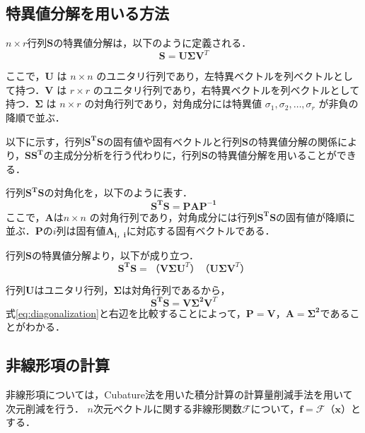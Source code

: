 \documentclass[a4j,12pt]{jreport}
\begin{document}
\subsection{特異値分解を用いる方法}
$n \times r$行列$\mathbf{S}$の特異値分解は，以下のように定義される．
\[
\mathbf{S} = \mathbf{U} \mathbf{\Sigma} \mathbf{V}^T
\]

ここで，\( \mathbf{U} \) は \( n \times n \) のユニタリ行列であり，左特異ベクトルを列ベクトルとして持つ．\( \mathbf{V} \) は \( r \times r \) のユニタリ行列であり，右特異ベクトルを列ベクトルとして持つ．\(\mathbf{ \Sigma }\) は \( n \times r \) の対角行列であり，対角成分には特異値 \( \sigma_1, \sigma_2, \dots, \sigma_r \) が非負の降順で並ぶ．

以下に示す，行列$\mathbf{S^T}\mathbf{S}$の固有値や固有ベクトルと行列$\mathbf{S}$の特異値分解の関係により，$\mathbf{S}\mathbf{S^T}$の主成分分析を行う代わりに，行列\(\mathbf{S}\)の特異値分解を用いることができる．

行列$\mathbf{S^T}\mathbf{S}$の対角化を，以下のように表す．
\begin{equation}\label{eq:diagonalization}
	\mathbf{S^T}\mathbf{S} = \mathbf{P}\mathbf{A}\mathbf{P^{-1}}
\end{equation}
ここで，\(\mathbf{A}\)は\( n \times n \) の対角行列であり，対角成分には行列$\mathbf{S^T}\mathbf{S}$の固有値が降順に並ぶ．\(\mathbf{P}\)の\(i\)列は固有値\(\mathbf{A_{i，i}}\)に対応する固有ベクトルである．

行列\(\mathbf{S}\)の特異値分解より，以下が成り立つ．
\[
\mathbf{S^T}\mathbf{S} = （\mathbf{V} \mathbf{\Sigma} \mathbf{U}^T）（\mathbf{U} \mathbf{\Sigma} \mathbf{V}^T）
\]

行列\(\mathbf{U}\)はユニタリ行列，\(\mathbf{\Sigma}\)は対角行列であるから，
\[
\mathbf{S^T}\mathbf{S} = \mathbf{V}\mathbf{\Sigma^2} \mathbf{V}^T
\]
式\ref{eq:diagonalization}と右辺を比較することによって，\(\mathbf{P} = \mathbf{V} \)，\(\mathbf{A} = \mathbf{\Sigma^2} \)であることがわかる．

\subsection{非線形項の計算}
非線形項については，Cubature法を用いた積分計算の計算量削減手法を用いて次元削減を行う．
$n$次元ベクトルに関する非線形関数$\mathcal{F}$について，$\bm{f} = \mathcal{F}（\bm{x}）$とする．
\end{document}
